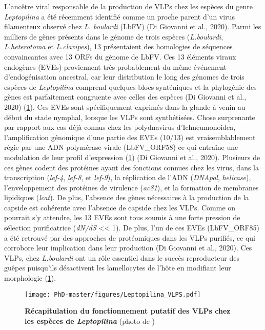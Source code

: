 L'ancêtre viral responsable de la production de VLPs chez les espèces du genre \textit{Leptopilina} a été récemment identifié comme un proche parent d'un virus filamenteux observé chez \textit{L. boulardi} (LbFV) (Di Giovanni et al., 2020). Parmi les milliers de gènes présents dans le génome de trois espèces (\textit{L.boulardi}, \textit{L.heterotoma} et \textit{L.clavipes}), 13 présentaient des homologies de séquences convaincantes avec 13 ORFs du génome de LbFV. Ces 13 éléments viraux endogènes (EVEs) proviennent très probablement du même événement d'endogénisation ancestral, car leur distribution le long des génomes de trois espèces de \textit{Leptopilina} comprend quelques blocs synténiques et la phylogénie des gènes est parfaitement congruente avec celles des espèces (Di Giovanni et al., 2020) (\figurename{\ref{figure:Leptopilina_VLPs}}). Ces EVEs sont spécifiquement exprimés dans la glande à venin au début du stade nymphal, lorsque les VLPs sont synthétisées. Chose surprenante par rapport aux cas déjà connus chez les polydnavirus  d'Ichneumonoidea, l'amplification génomique d'une partie des EVEs  (10/13) est vraisemblablement régie par une ADN polymérase virale (LbFV\_ORF58) ce qui  entraîne une modulation de leur profil d'expression (\figurename{\ref{figure:Leptopilina_VLPs}}) (Di Giovanni et al., 2020). Plusieurs de ces gènes codent des protéines ayant des fonctions connues chez les virus, dans la transcription (\textit{lef-4}, \textit{lef-8}, et \textit{lef-9}), la réplication de l'ADN (\textit{DNApol}, \textit{helicase}), l'enveloppement des protéines de virulence (\textit{ac81}), et la formation de membranes lipidiques (\textit{lcat}). De plus, l'absence des gènes nécessaires à la production de la capside est cohérente avec l'absence de capside chez les VLPs. Comme on pourrait s'y attendre, les 13 EVEs sont tous soumis à une forte pression de sélection purificatrice (\textit{dN/dS} << 1). De plus, l'un de ces EVEs (LbFV\_ORF85) a été retrouvé par des approches de protéomiques dans les VLPs purifiés, ce qui corrobore leur implication dans leur production (Di Giovanni et al., 2020). Ces VLPs, chez \textit{L.boulardi} ont un rôle essentiel dans le succès reproducteur des guêpes puisqu'ils désactivent les lamellocytes de l'hôte en modifiant leur morphologie  \citep{rizki_parasitoid_1990, colinet_convergent_2007} (\figurename{\ref{figure:Leptopilina_VLPs}}).

\begin{figure}[!htpbt]
\captionsetup{font=footnotesize}
 \centering
  \texttt{[image: PhD-master/figures/Leptopilina\_VLPS.pdf]}
\caption[Intro:Récapitulation du fonctionnement putatif des VLPs chez les espèces de \textit{Leptopilina}]{\textbf{Récapitulation du fonctionnement putatif des VLPs chez les espèces de \textit{Leptopilina}} (photo de \cite{colinet_convergent_2007})}
\label{figure:Leptopilina_VLPs}
\end{figure}

